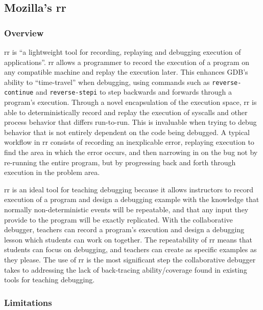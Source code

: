 \documentclass[12pt]{article}
\begin{document}
\subsection{Mozilla's rr}\label{rr}

\subsubsection{Overview}

rr is ``a lightweight tool for recording, replaying and debugging
execution of applications''\cite{rr-repo}. rr allows a programmer to
record the execution of a program on any compatible machine and replay
the execution later.  This enhances GDB's ability to ``time-travel''
when debugging, using commands such as \lstinline{reverse-continue}
and \lstinline{reverse-stepi}\cite{gdbman} to step backwards and
forwards through a program's execution.  Through a novel encapsulation
of the execution space, rr is able to deterministically record and
replay the execution of syscalls and other process behavior that
differs run-to-run.  This is invaluable when trying to debug behavior
that is not entirely dependent on the code being debugged.  A typical
workflow in rr consists of recording an inexplicable error, replaying
execution to find the area in which the error occurs, and then
narrowing in on the bug not by re-running the entire program, but by
progressing back and forth through execution in the problem area.
\par

rr is an ideal tool for teaching debugging because it allows
instructors to record execution of a program and design a debugging
example with the knowledge that normally non-deterministic events will
be repeatable, and that any input they provide to the program will be
exactly replicated.  With the collaborative debugger, teachers can
record a program's execution and design a debugging lesson which
students can work on together.  The repeatability of rr means that
students can focus on debugging, and teachers can create as specific
examples as they please.  The use of rr is the most significant step
the collaborative debugger takes to addressing the lack of
back-tracing ability/coverage found in existing tools for teaching
debugging\cite{10.1145/3286960.3286970}.

\subsubsection{Limitations}
\end{document}
